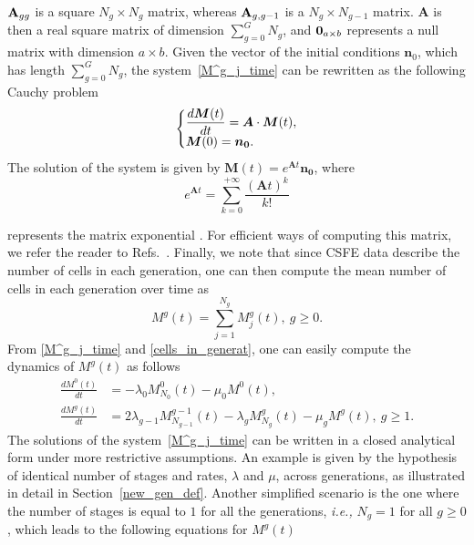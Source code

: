 \documentclass[10pt]{article}
\makeatletter
\numberwithin{equation}{section}
\newenvironment{sistema}%
{\left\lbrace\begin{array}{@{}l@{}}}%
{\end{array}\right.}
\makeatother
\begin{document}
\par\noindent ${\bf A}_{gg}$ is a square  $N_g \times N_g$ matrix, whereas ${\bf A}_{g,g-1}$ is a  $N_g \times N_{g-1}$ matrix.
$\boldsymbol{A}$ is then a real square matrix of dimension $\sum_{g=0}^G N_g$, and ${\bf 0}_{a\times b}$ represents a null matrix with dimension $a\times b$. Given the vector of the initial conditions $\boldsymbol n_0$, which has length $\sum_{g=0}^G N_g$, the system~\eqref{M^g_j_time} can be rewritten as the
following Cauchy problem
\[ 
\begin{sistema} 
    \displaystyle{\frac{d \boldsymbol{M}(t)}{dt}} = \boldsymbol{A}\cdot \boldsymbol{M}(t), \\
    \boldsymbol{M}(0) = \boldsymbol{n_0}.
\end{sistema} 
\]
The solution of the system is given by $\boldsymbol{M}(t) = e^{\boldsymbol{A} t} \boldsymbol{n_0}$, where 
\begin{equation*}
    e^{\boldsymbol{A} t} = \sum_{k=0}^{+ \infty} \frac{(\boldsymbol{A} t)^k}{k!}
\end{equation*}
\par\noindent represents the  matrix exponential . For efficient ways of computing this matrix, we refer the reader to Refs.~\cite{gomez2013maximum,gomez2014maximum,moler1978nineteen,moler2003nineteen}. Finally, we note that since CSFE data describe the number of cells in each generation, one can then compute the mean number of cells in each generation over time as 
\begin{equation}
\label{cells_in_generat}
    M^g(t) = \sum_{j=1}^{N_g} M^g_j(t), \ g \ge 0.
\end{equation}
From \eqref{M^g_j_time} and \eqref{cells_in_generat}, one can easily compute the dynamics of $M^g(t)$ as follows
\begin{equation}
\label{EQofGENS_Erlang}
    \begin{split}
        \frac{dM^0(t)}{dt} & = -\lambda_0 M^0_{N_0}(t) - \mu_0 M^0(t), \\
        \frac{dM^g(t)}{dt} & = 2 \lambda_{g-1} M^{g-1}_{N_{g-1}}(t) - \lambda_g M^g_{N_g}(t) - \mu_g M^g(t), \ g \ge 1.
    \end{split}
\end{equation}
The  solutions of the system~\eqref{M^g_j_time} can be written in a closed analytical form under more restrictive assumptions. An example is given by the hypothesis of identical number of stages and rates, $\lambda$ and $\mu$, across generations, as illustrated in detail in Section~\ref{new_gen_def}. Another simplified scenario is the one where the number of stages is equal to $1$ for all the generations, {\em i.e.,} $N_g=1$ for all $g \ge 0$, which leads to the following equations for $M^g(t)$
\end{document}
